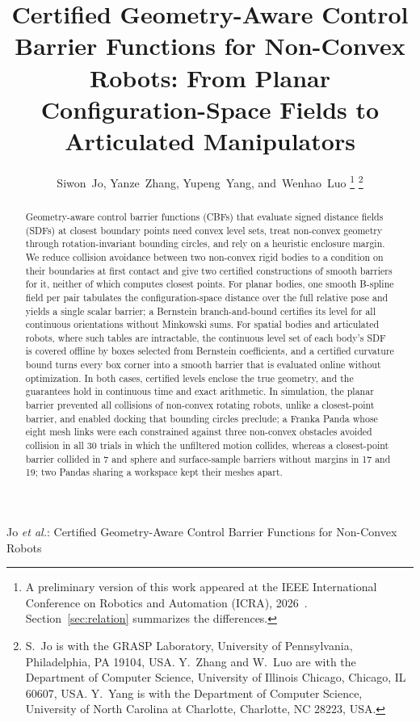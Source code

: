 \documentclass[journal]{IEEEtran}
\theoremstyle{definition}
\newif\ifanonymous
\begin{document}
\title{Certified Geometry-Aware Control Barrier Functions for Non-Convex Robots: From Planar
Configuration-Space Fields to Articulated Manipulators}

\ifanonymous
\author{Anonymous Authors}
\markboth{IEEE Transactions on Robotics}%
{Certified Geometry-Aware Control Barrier Functions for Non-Convex Robots}
\else
\author{Siwon~Jo, Yanze~Zhang, Yupeng~Yang, and~Wenhao~Luo%
\thanks{A preliminary version of this work appeared at the IEEE International Conference on
Robotics and Automation (ICRA), 2026~\cite{jo2026geometry}. Section~\ref{sec:relation}
summarizes the differences.}%
\thanks{S.~Jo is with the GRASP Laboratory, University of Pennsylvania, Philadelphia, PA 19104,
USA. Y.~Zhang and W.~Luo are with the Department of Computer Science, University of Illinois
Chicago, Chicago, IL 60607, USA. Y.~Yang is with the Department of Computer Science, University
of North Carolina at Charlotte, Charlotte, NC 28223, USA.}}

%
{Jo \MakeLowercase{\textit{et al.}}: Certified Geometry-Aware Control Barrier Functions for Non-Convex Robots}
\fi

\maketitle

\begin{abstract}
Geometry-aware control barrier functions (CBFs) that evaluate signed distance fields (SDFs) at
closest boundary points need convex level sets, treat non-convex geometry through rotation-invariant
bounding circles, and rely on a heuristic enclosure margin. We reduce collision avoidance between
two non-convex rigid bodies to a condition on their boundaries at first contact and give two
certified constructions of smooth barriers for it, neither of which computes closest points. For
planar bodies, one smooth B-spline field per pair tabulates the configuration-space distance over
the full relative pose and yields a single scalar barrier; a Bernstein branch-and-bound certifies
its level for all continuous orientations without Minkowski sums. For spatial bodies and
articulated robots, where such tables are intractable, the continuous level set of each body's SDF
is covered offline by boxes selected from Bernstein coefficients, and a certified curvature bound
turns every box corner into a smooth barrier that is evaluated online without optimization. In
both cases, certified levels enclose the true geometry, and the guarantees hold in continuous time
and exact arithmetic. In simulation, the planar barrier prevented all collisions of non-convex
rotating robots, unlike a closest-point barrier, and enabled docking that bounding circles preclude;
a Franka Panda whose eight mesh links were each constrained against three non-convex obstacles
avoided collision in all 30 trials in which the unfiltered motion collides, whereas a
closest-point barrier collided in 7 and sphere and surface-sample barriers without margins in 17
and 19; two Pandas sharing a workspace kept their meshes apart.
\end{abstract}
\end{document}
